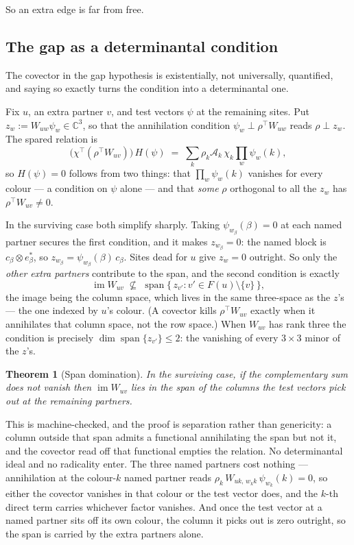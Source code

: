 \documentclass[11pt]{article}
\newtheorem{theorem}{Theorem}[section]
\theoremstyle{definition}
\theoremstyle{remark}
\begin{document}
So an extra edge is far from free.

\subsection*{The gap as a determinantal condition}

The covector in the gap hypothesis is existentially, not universally, quantified, and
saying so exactly turns the condition into a determinantal one.

Fix $u$, an extra partner $v$, and test vectors $\psi$ at the remaining sites. Put
$z_w := W_{uw}\psi_w \in \mathbb{C}^3$, so that the annihilation condition
$\psi_w \perp \rho^{\!\top}W_{uw}$ reads $\rho \perp z_w$. The spared relation is
\[
  \bigl(\chi^{\!\top}(\rho^{\!\top}W_{uv})\bigr)\, H(\psi)
  \;=\; \sum_k \rho_k \mathcal{A}_k\, \chi_k \prod_{w} \psi_w(k) ,
\]
so $H(\psi) = 0$ follows from two things: that $\prod_w \psi_w(k)$ vanishes for every
colour --- a condition on $\psi$ alone --- and that \emph{some} $\rho$ orthogonal to all
the $z_w$ has $\rho^{\!\top}W_{uv} \neq 0$.

In the surviving case both simplify sharply. Taking $\psi_{w_\beta}(\beta) = 0$ at each
named partner secures the first condition, and it makes $z_{w_\beta} = 0$: the named block
is $c_\beta \otimes e_\beta^{*}$, so $z_{w_\beta} = \psi_{w_\beta}(\beta)\,c_\beta$. Sites
dead for $u$ give $z_w = 0$ outright. So only the \emph{other extra partners} contribute
to the span, and the second condition is exactly
\[
  \operatorname{im} W_{uv} \;\not\subseteq\; \operatorname{span}\{\,z_{v'} : v' \in F(u)
  \setminus \{v\}\,\} ,
\]
the image being the column space, which lives in the same three-space as the $z$'s --- the
one indexed by $u$'s colour. (A covector kills $\rho^{\!\top}W_{uv}$ exactly when it
annihilates that column space, not the row space.) When $W_{uv}$ has rank three the
condition is precisely $\dim \operatorname{span}\{z_{v'}\} \leq 2$: the vanishing of every
$3 \times 3$ minor of the $z$'s.

\begin{theorem}[Span domination]\label{thm:spandom}
In the surviving case, if the complementary sum does not vanish then
$\operatorname{im} W_{uv}$ lies in the span of the columns the test vectors pick out at
the remaining partners.
\end{theorem}

This is machine-checked, and the proof is separation rather than genericity: a column
outside that span admits a functional annihilating the span but not it, and the covector
read off that functional empties the relation. No determinantal ideal and no radicality
enter. The three named partners cost nothing --- annihilation at the colour-$k$ named
partner reads $\rho_k \, W_{uk,\,w_k k}\, \psi_{w_k}(k) = 0$, so either the covector
vanishes in that colour or the test vector does, and the $k$-th direct term carries
whichever factor vanishes. And once the test vector at a named partner sits off its own
colour, the column it picks out is zero outright, so the span is carried by the extra
partners alone.
\end{document}
